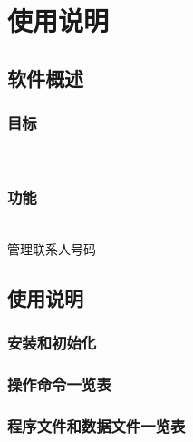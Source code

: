 \chapter{使用说明}
\section{软件概述}
	\subsection{目标}\\
	
	\subsection{功能}\\
	管理联系人号码
\section{使用说明}
	\subsection{安装和初始化}
	\subsection{操作命令一览表}
	\subsection{程序文件和数据文件一览表}